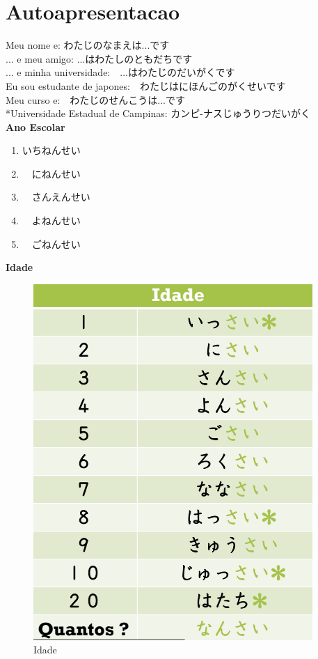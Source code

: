 \documentclass[a4paper, 12pt]{article}
\begin{document}
\newpage
\section{Autoapresentacao}
	\begin{CJK}{UTF8}{min}
		Meu nome e: わたじのなまえは...です\\
		... e meu amigo: ...はわたしのともだちです\\
		... e minha universidade:　...はわたじのだいがくです\\
		Eu sou estudante de japones:　わたじはにほんごのがくせいです\\
		Meu curso e:　わたじのせんこうは...です\\
		
		*Universidade Estadual de Campinas: カンピ-ナスじゅうりつだいがく\\
		
		\Large
		\textbf{Ano Escolar}\\
		\normalsize
			\begin{enumerate}
				\item いちねんせい
				\item　にねんせい
				\item　さんえんせい
				\item　よねんせい
				\item　ごねんせい
			\end{enumerate}
		
		\Large
		\textbf{Idade}\\
		\normalsize
		\begin{figure}[h]
			\centering
			\includegraphics[width=0.5\linewidth]{Imagens/idade}
			\caption{Idade}
			\label{fig:idade}
		\end{figure}
		
		
		
		
	\end{CJK}
\end{document}

